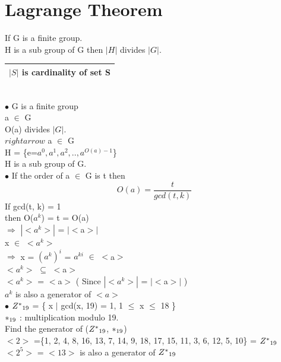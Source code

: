 \documentclass[11pt]{article}
\begin{document}
	\section{Lagrange Theorem}
	If G is a finite group.\\
	H is a sub group of G then $|H|$ divides $|G|$.\hfill 
	\begin{tabular}{| c |}
		\hline
		$|S|$ is cardinality of set S\\
		\hline
	\end{tabular}\vspace{0.3cm}\\
	$\bullet$ G is a finite group \\
	a $\in$ G\\
	O(a) divides $|G|$.\\
	$rightarrow$ a $\in$ G\\
	H = \{e=$a^0, a^1, a^2,.., a^{O(a)-1}$\}\\
	H is a sub group of G.\vspace{0.3cm}\\
	$\bullet$ If the order of a $\in$ G is t then $$O(a) = \frac{t}{gcd(t,k)}$$
	If gcd(t, k) = 1\\
	then O($a^k$) = t = O(a)\\
	$\Rightarrow$ $|<a^k>|$ = $|<$a$>|$\\
	x $\in$ $<a^k>$\\
	$\Rightarrow$ x = $(a^k)^i$ = $a^{ki}$ $\in$ $<$a$>$ \\
	$<a^k>$ $\subseteq$ $<$a$>$\\
	$<a^k>$ = $<$a$>$ \hfill ( Since $|<a^k>|$ = $|<$a$>|$ )\\
	$a^k$ is also a generator of $<a>$\vspace{0.3cm}\\
	$\bullet$ ${Z^{\ast}}\textsubscript{19}$ = \{ x $|$ gcd(x, 19) = 1, 1 $\leq$ x $\leq$ 18 \}\\
	$\ast\textsubscript{19}$ : multiplication modulo 19.\vspace{0.3cm}\\
	Find the generator of (${Z^{\ast}}\textsubscript{19}$, $\ast\textsubscript{19}$)\\
	$<2>$ =\{1, 2, 4, 8, 16, 13, 7, 14, 9, 18, 17, 15, 11, 3, 6, 12, 5, 10\} = ${Z^{\ast}}\textsubscript{19}$\\
	$<2^5>$ = $<13>$ is also a generator of ${Z^{\ast}}\textsubscript{19}$\\
	
\end{document}
